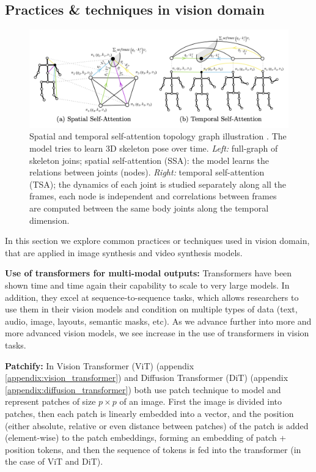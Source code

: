 \subsection{Practices \& techniques in vision domain}

\begin{figure}
    \centering
    \includegraphics[width=1\textwidth]{images/video_synthesis/spatial_and_temporal_self_attention.png}
    \caption{Spatial and temporal self-attention topology graph illustration \cite{plizzari2021spatial}. The model tries to learn 3D skeleton pose over time. \textit{Left:} full-graph of skeleton joins; spatial self-attention (SSA): the model learns the relations between joints (nodes). \textit{Right:} temporal self-attention (TSA); the dynamics of each joint is studied separately along all the frames, each node is independent and correlations between frames are computed between the same body joints along the temporal dimension.}
    \label{fig:spatial_temporal_self_attention}
\end{figure}

In this section we explore common practices or techniques used in vision domain, that are applied in image synthesis and video synthesis models.

\textbf{Use of transformers for multi-modal outputs:} Transformers have been shown time and time again their capability to scale to very large models. In addition, they excel at sequence-to-sequence tasks, which allows researchers to use them in their vision models and condition on multiple types of data (text, audio, image, layouts, semantic masks, etc). As we advance further into more and more advanced vision models, we see increase in the use of transformers in vision tasks.

\textbf{Patchify:} In Vision Transformer (ViT) \cite{vision_transformer} (appendix \ref{appendix:vision_transformer}) and Diffusion Transformer (DiT) \cite{diffusion_transformer} (appendix \ref{appendix:diffusion_transformer}) both use patch technique to model and represent patches of size $p \times p$ of an image. First the image is divided into patches, then each patch is linearly embedded into a vector, and the position (either absolute, relative or even distance between patches) of the patch is added (element-wise) to the patch embeddings, forming an embedding of patch + position tokens, and then the sequence of tokens is fed into the transformer (in the case of ViT and DiT). 

